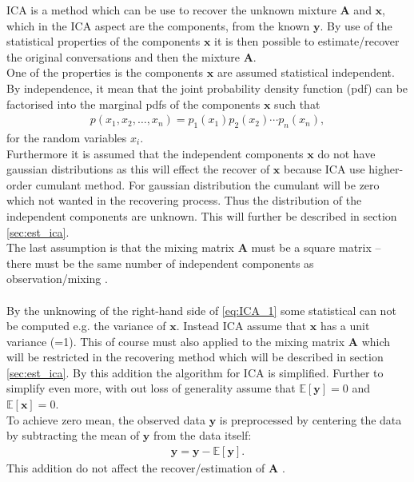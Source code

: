 ICA is a method which can be use to recover the unknown mixture $\mathbf{A}$ and $\mathbf{x}$, which in the ICA aspect are the components, from the known $\mathbf{y}$. By use of the statistical properties of the components $\mathbf{x}$ it is then possible to estimate/recover the original conversations and then the mixture $\mathbf{A}$.
\\
One of the properties is the components $\mathbf{x}$ are assumed statistical independent. By independence, it mean that the joint probability density function (pdf) can be factorised into the marginal pdfs of the components $\mathbf{x}$ such that
\begin{align*}
p(x_1, x_2, \dots, x_n) = p_1 (x_1) p_2(x_2) \cdots p_n(x_n),
\end{align*}
for the random variables $x_i$.
\\
Furthermore it is assumed that the independent components $\mathbf{x}$ do not have gaussian distributions as this will effect the recover of $\mathbf{x}$ because ICA use higher-order cumulant method. For gaussian distribution the cumulant will be zero which not wanted in the recovering process. Thus the distribution of the independent components are unknown. This will further be described in section \ref{sec:est_ica}.
\\
The last assumption is that the mixing matrix $\mathbf{A}$ must be a square matrix -- there must be the same number of independent components as observation/mixing \cite[p. 152-153]{ICA}.
\\ \\
By the unknowing of the right-hand side of \eqref{eq:ICA_1} some statistical can not be computed e.g. the variance of $\mathbf{x}$. Instead ICA assume that $\mathbf{x}$ has a unit variance (=1). This of course must also applied to the mixing matrix $\mathbf{A}$ which will be restricted in the recovering method which will be described in section \ref{sec:est_ica}. By this addition the algorithm for ICA is simplified. Further to simplify even more, with out loss of generality assume that $\mathbb{E}[\mathbf{y}] = 0$ and $\mathbb{E}[\mathbf{x}] = 0$. 
\\
To achieve zero mean, the observed data $\mathbf{y}$ is preprocessed by centering the data by subtracting the mean of $\mathbf{y}$ from the data itself:
\begin{align*}
\mathbf{y} = \mathbf{y} - \mathbb{E}[\mathbf{y}].
\end{align*}
This addition do not affect the recover/estimation of $\mathbf{A}$ \cite[p. 154]{ICA}.
